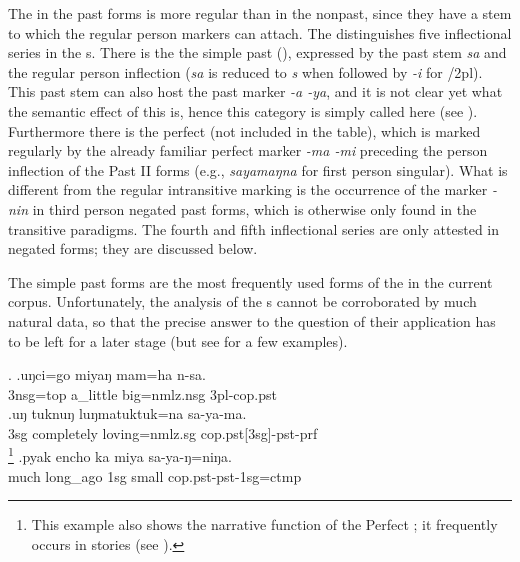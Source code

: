The  in the past  forms is more regular than in the nonpast, since they have a stem to which the regular person markers can attach. The  distinguishes five inflectional series in the s. There is the the simple past (), expressed by the past stem \emph{sa} and the regular person inflection (\emph{sa} is reduced to \emph{s} when followed by \emph{-i} for {/2pl}). This past stem can also host the past marker \emph{-a \ti -ya}, and it is not clear yet what the semantic effect of this is, hence this category is simply called  here (see ). Furthermore there is the perfect (not included in the table), which is marked regularly by the already familiar perfect marker \emph{-ma \ti -mi} preceding the person inflection of the Past II forms (e.g., \emph{sayamaŋna}  for first person singular). What is  different from the regular intransitive marking is the occurrence of the  marker \emph{-nin} in third person negated past forms, which is otherwise only found in the transitive paradigms. The fourth and fifth inflectional series are only attested in negated forms; they are discussed below.  


The simple past forms are the most frequently used  forms of the  in the current corpus. Unfortunately, the  analysis of the s cannot be corroborated by much natural data, so that the precise answer to the question of their application has to be left for a later stage (but see \Next for a few examples).

\ex. \ag.uŋci=go     miyaŋ mam=ha n-sa.\\
{\sc 3nsg=top} a\_little big{\sc =nmlz.nsg} {\sc 3pl-cop.pst}\\
\bg.uŋ tuknuŋ    luŋmatuktuk=na        sa-ya-ma.\\
{\sc 3sg} completely loving{\sc =nmlz.sg} {\sc cop.pst[3sg]-pst-prf}\\
\footnote{This example also shows the narrative function of the Perfect ; it frequently occurs in stories (see ).}  
\bg.pyak encho         ka  miya   sa-ya-ŋ=niŋa.\\
much long\_ago {\sc 1sg} small {\sc cop.pst-pst-1sg=ctmp}\\
 
 

